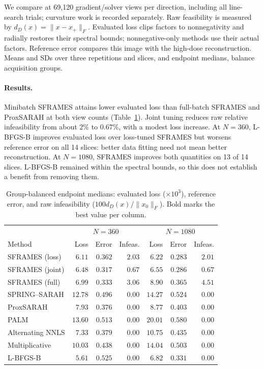 We compare at 69,120 gradient/solver views per direction, including all
line-search trials; curvature work is recorded separately.
Raw feasibility is measured by \(d_D(x)=\|x-x_+\|_F\).
Evaluated loss clips factors to nonnegativity and radially restores their
spectral bounds; nonnegative-only methods use their actual factors.
Reference error compares this image with the high-dose reconstruction.
Means and SDs over three repetitions and slices, and endpoint medians,
balance acquisition groups.

\paragraph{Results.}
Minibatch SFRAMES attains lower evaluated loss than full-batch SFRAMES and
ProxSARAH at both view counts (Table~\ref{tab:ct-results}). Joint tuning
reduces raw relative infeasibility from about \(2\%\) to \(0.67\%\), with a
modest loss increase. At \(N=360\), L-BFGS-B improves evaluated loss over
loss-tuned SFRAMES but worsens reference error on all 14 slices: better data
fitting need not mean better reconstruction. At \(N=1080\), SFRAMES improves
both quantities on 13 of 14 slices. L-BFGS-B remained within the spectral
bounds, so this does not establish a benefit from removing them.
\begin{table}[!htbp]\centering\small
\caption{Group-balanced endpoint medians: evaluated loss ($\times10^3$), reference error, and raw infeasibility ($100d_D(x)/\|x_0\|_F$). Bold marks the best value per column.}
\label{tab:ct-results}\setlength{\tabcolsep}{5pt}
\begin{tabular}{@{}lrrrrrr@{}}\toprule
& \multicolumn{3}{c}{$N=360$} & \multicolumn{3}{c}{$N=1080$} \\
Method & Loss & Error & Infeas. & Loss & Error & Infeas. \\\midrule
SFRAMES (loss) & $6.11$ & $0.362$ & $2.03$ & $\mathbf{6.22}$ & $\mathbf{0.283}$ & $2.01$ \\
SFRAMES (joint) & $6.48$ & $\mathbf{0.317}$ & $0.67$ & $6.55$ & $0.286$ & $0.67$ \\
SFRAMES (full) & $6.99$ & $0.333$ & $3.06$ & $8.90$ & $0.365$ & $4.51$ \\
SPRING--SARAH & $12.78$ & $0.496$ & $\mathbf{0.00}$ & $14.27$ & $0.524$ & $\mathbf{0.00}$ \\
ProxSARAH & $7.93$ & $0.376$ & $\mathbf{0.00}$ & $8.77$ & $0.403$ & $\mathbf{0.00}$ \\
PALM & $13.60$ & $0.513$ & $\mathbf{0.00}$ & $20.01$ & $0.580$ & $\mathbf{0.00}$ \\
Alternating NNLS & $7.33$ & $0.379$ & $\mathbf{0.00}$ & $10.75$ & $0.435$ & $\mathbf{0.00}$ \\
Multiplicative & $10.03$ & $0.438$ & $\mathbf{0.00}$ & $14.04$ & $0.503$ & $\mathbf{0.00}$ \\
L-BFGS-B & $\mathbf{5.61}$ & $0.525$ & $\mathbf{0.00}$ & $6.82$ & $0.331$ & $\mathbf{0.00}$ \\
\bottomrule\end{tabular}\end{table}
